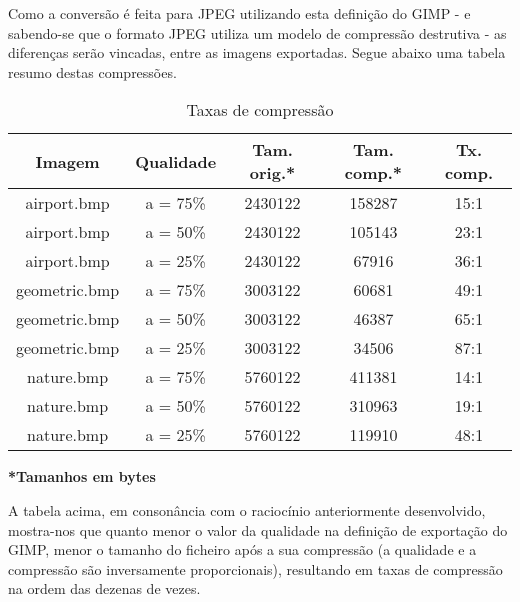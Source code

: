 \documentclass{article}
\begin{document}
Como a conversão é feita para JPEG utilizando esta definição do GIMP - e sabendo-se que o formato JPEG utiliza um modelo de compressão destrutiva - as diferenças serão vincadas, entre as imagens exportadas. Segue abaixo uma tabela resumo destas compressões.

\begin{table}[H]
    \centering
    \begin{tabular}{|c|c|c|c|c|}
        \hline
        Imagem & Qualidade & Tam. orig.* & Tam. comp.* & Tx. comp. \\
        \hline
        airport.bmp & a = 75\% & 2430122 & 158287 & 15:1 \\
        \hline
        airport.bmp & a = 50\% & 2430122 & 105143 & 23:1 \\
        \hline
        airport.bmp & a = 25\% & 2430122 & 67916 & 36:1 \\
        \hline
        geometric.bmp & a = 75\% & 3003122 & 60681 & 49:1 \\
        \hline
        geometric.bmp & a = 50\% & 3003122 & 46387 & 65:1 \\
        \hline
        geometric.bmp & a = 25\% & 3003122 & 34506 & 87:1 \\
        \hline
        nature.bmp & a = 75\% & 5760122 & 411381 & 14:1 \\
        \hline
        nature.bmp & a = 50\% & 5760122 & 310963 & 19:1 \\
        \hline
        nature.bmp & a = 25\% & 5760122 & 119910 & 48:1 \\
        \hline
    \end{tabular}
    \caption{Taxas de compressão}
    \label{tab:tabela1}
\end{table}

\hspace{14mm}\textbf{*Tamanhos em bytes}

A tabela acima, em consonância com o raciocínio anteriormente desenvolvido, mostra-nos que quanto menor o valor da qualidade na definição de exportação do GIMP, menor o tamanho do ficheiro após a sua compressão (a qualidade e a compressão são inversamente proporcionais), resultando em taxas de compressão na ordem das dezenas de vezes.
\end{document}
